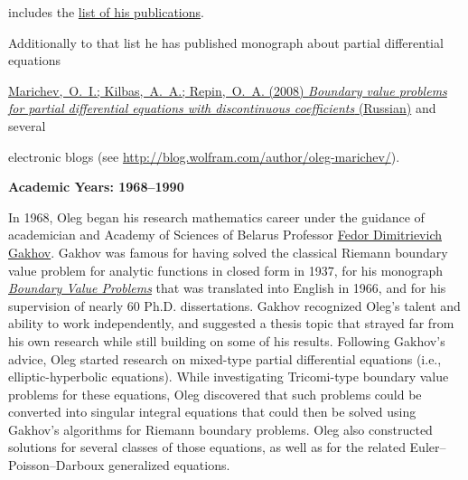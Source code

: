 {includes the \href{http://web.archive.org/web/20120922034933/http://www.wolfram.com/news/events/techconf2005/MarichevPublications.nb}{list of his publications}. 

Additionally to that list he has published monograph about partial differential equations

\href{https://www.zbmath.org/?q=an:1147.35003}{Marichev,~O.~I.; Kilbas,~A.~A.; Repin,~O.~A. (2008) \textit{Boundary value problems for partial differential equations with discontinuous coefficients} (Russian)}  and several

electronic blogs (see \url{http://blog.wolfram.com/author/oleg-marichev/}).

}







\noindent

\textbf{Academic Years: 1968–1990}



\noindent

In 1968, Oleg began his research mathematics career under the guidance of academician and Academy of Sciences of Belarus Professor \href{http://www.genealogy.ams.org/id.php?id=35197}{Fedor Dimitrievich Gakhov}. Gakhov was famous for having solved the classical Riemann boundary value problem for analytic functions in closed form in 1937, for his monograph \href{http://www.worldcat.org/title/boundary-value-problems/oclc/1722840&referer=brief_results}{\textit{Boundary Value Problems}} that was translated into English in 1966, and for his supervision of nearly 60 Ph.D. dissertations. Gakhov recognized Oleg's talent and ability to work independently, and suggested a thesis topic that strayed far from his own research while still building on some of his results. Following Gakhov's advice, Oleg started research on mixed-type partial differential equations (i.e., elliptic-hyperbolic equations). While investigating Tricomi-type boundary value problems for these equations, Oleg discovered that such problems could be converted into singular integral equations that could then be solved using Gakhov's algorithms for Riemann boundary problems. Oleg also constructed solutions for several classes of those equations, as well as for the related Euler–Poisson–Darboux generalized equations.



